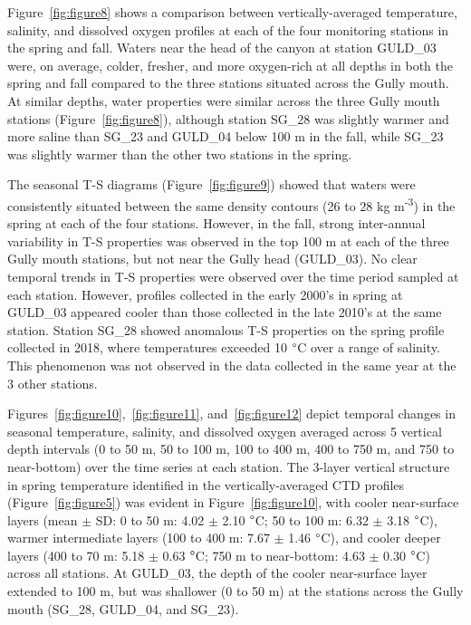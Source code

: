 \documentclass[12pt]{article}\usepackage[]{graphicx}\usepackage[]{color}
\begin{document}
Figure~\ref{fig:figure8} shows a comparison between vertically-averaged temperature, salinity, and dissolved oxygen profiles at each of the four monitoring stations in the spring and fall. Waters near the head of the canyon at station GULD\_03 were, on average, colder, fresher, and more oxygen-rich at all depths in both the spring and fall compared to the three stations situated across the Gully mouth. At similar depths, water properties were similar across the three Gully mouth stations (Figure~\ref{fig:figure8}), although station SG\_28 was slightly warmer and more saline than SG\_23 and GULD\_04 below 100 m in the fall, while SG\_23 was slightly warmer than the other two stations in the spring.

The seasonal T-S diagrams (Figure~\ref{fig:figure9}) showed that waters were consistently situated between the same density contours (26 to 28 kg m\textsuperscript{-3}) in the spring at each of the four stations. However, in the fall, strong inter-annual variability in T-S properties was observed in the top 100 m at each of the three Gully mouth stations, but not near the Gully head (GULD\_03). No clear temporal trends in T-S properties were observed over the time period sampled at each station. However, profiles collected in the early 2000's in spring at GULD\_03 appeared cooler than those collected in the late 2010's at the same station. Station SG\_28 showed anomalous T-S properties on the spring profile collected in 2018, where temperatures exceeded 10 \(\degree\)C over a range of salinity. This phenomenon was not observed in the data collected in the same year at the 3 other stations.

Figures~\ref{fig:figure10},~\ref{fig:figure11}, and~\ref{fig:figure12} depict temporal changes in seasonal temperature, salinity, and dissolved oxygen averaged across 5 vertical depth intervals (0 to 50 m, 50 to 100 m, 100 to 400 m, 400 to 750 m, and 750 to near-bottom) over the time series at each station. The 3-layer vertical structure in spring temperature identified in the vertically-averaged CTD profiles (Figure~\ref{fig:figure5}) was evident in Figure~\ref{fig:figure10}, with cooler near-surface layers (mean \(\pm\) SD: 0 to 50 m: 4.02 \(\pm\) 2.10 \(\degree\)C; 50 to 100 m: 6.32 \(\pm\) 3.18 \(\degree\)C), warmer intermediate layers (100 to 400 m: 7.67 \(\pm\) 1.46 \(\degree\)C), and cooler deeper layers (400 to 70 m: 5.18 \(\pm\) 0.63 \(\degree\)C; 750 m to near-bottom: 4.63 \(\pm\) 0.30 \(\degree\)C) across all stations. At GULD\_03, the depth of the cooler near-surface layer extended to 100 m, but was shallower (0 to 50 m) at the stations across the Gully mouth (SG\_28, GULD\_04, and SG\_23).
\end{document}
